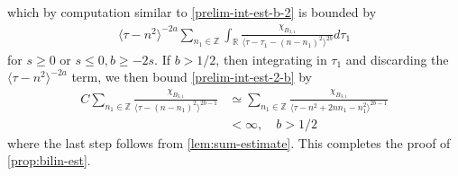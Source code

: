 \documentclass[12pt,reqno]{amsart}
\numberwithin{equation}{section}  %
\numberwithin{figure}{section}
\newcommand{\rr}{\mathbb{R}}
\newcommand{\zz}{\mathbb{Z}}
\theoremstyle{plain}
\theoremstyle{definition}
\theoremstyle{remark}
\begin{document}
%
%
which by computation similar to \eqref{prelim-int-est-b-2}
is bounded by
%
%
\begin{equation}
  \label{prelim-int-est-2-b}
\begin{split}
\langle \tau - n^{2}  \rangle ^{-2a} \sum_{n_{1} \in \zz} \int_{\rr} \frac{\chi_{B_{3,1}} }{ \langle  \tau - \tau_{1} - (n -
n_{1})^{2}  \rangle^{2b}}
d \tau_1 
\end{split}
\end{equation}
%
%
for $s \ge 0$ or $s \le 0, b \ge -2s$. If $b > 1/2$, then integrating in
$\tau_{1}$ and discarding the  $\langle \tau - n^{2}  \rangle ^{-2a}$ term, we
then bound \eqref{prelim-int-est-2-b} by
%
%
\begin{equation*}
\begin{split}
  C \sum_{n_{1} \in \zz} \frac{\chi_{B_{3,1}}}{\langle \tau - (n -
  n_{1})^{2} \rangle ^{2b -1}}
  & \simeq
  \sum_{n_{1} \in \zz} \frac{\chi_{B_{3,1}}}{\langle \tau - n^{2} +
  2nn_{1} - n_{1}^{2}
  \rangle ^{2b -1}}
  \\
  & < \infty, \quad b > 1/2
\end{split}
\end{equation*}
%
%
where the last step follows from  \autoref{lem:sum-estimate}. This completes the
proof of \autoref{prop:bilin-est}. \qquad \qedsymbol
\end{document}
